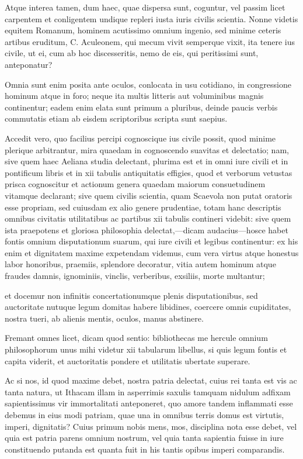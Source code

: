 Atque interea tamen, dum haec, quae dispersa sunt, coguntur, vel passim licet carpentem et conligentem undique repleri iusta iuris civilis scientia. Nonne videtis equitem Romanum, hominem acutissimo omnium ingenio, sed minime ceteris artibus eruditum, C. Aculeonem, qui mecum vivit semperque vixit, ita tenere ius civile, ut ei, cum ab hoc discesseritis, nemo de eis, qui peritissimi sunt, anteponatur?

 Omnia sunt enim posita ante oculos, conlocata in usu cotidiano, in congressione hominum atque in foro; neque ita multis litteris aut voluminibus magnis continentur; eadem enim elata sunt primum a pluribus, deinde paucis verbis commutatis etiam ab eisdem scriptoribus scripta sunt saepius.

 Accedit vero, quo facilius percipi cognoscique ius civile possit, quod minime plerique arbitrantur, mira quaedam in cognoscendo suavitas et delectatio; nam, sive quem haec Aeliana studia delectant, plurima est et in omni iure civili et in pontificum libris et in xii tabulis antiquitatis effigies, quod et verborum vetustas prisca cognoscitur et actionum genera quaedam maiorum consuetudinem vitamque declarant; sive quem civilis scientia, quam Scaevola non putat oratoris esse propriam, sed cuiusdam ex alio genere prudentiae, totam hanc descriptis omnibus civitatis utilitatibus ac partibus xii tabulis contineri videbit: sive quem ista praepotens et gloriosa philosophia delectat,—dicam audacius—hosce habet fontis omnium disputationum suarum, qui iure civili et legibus continentur: ex his enim et dignitatem maxime expetendam videmus, cum vera virtus atque honestus labor honoribus, praemiis, splendore decoratur, vitia autem hominum atque fraudes damnis, ignominiis, vinclis, verberibus, exsiliis, morte multantur;

 et docemur non infinitis concertationumque plenis disputationibus, sed auctoritate nutuque legum domitas habere libidines, coercere omnis cupiditates, nostra tueri, ab alienis mentis, oculos, manus abstinere.

 Fremant omnes licet, dicam quod sentio: bibliothecas me hercule omnium philosophorum unus mihi videtur xii tabularum libellus, si quis legum fontis et capita viderit, et auctoritatis pondere et utilitatis ubertate superare.

 Ac si nos, id quod maxime debet, nostra patria delectat, cuius rei tanta est vis ac tanta natura, ut Ithacam illam in asperrimis saxulis tamquam nidulum adfixam sapientissimus vir immortalitati anteponeret, quo amore tandem inflammati esse debemus in eius modi patriam, quae una in omnibus terris domus est virtutis, imperi, dignitatis? Cuius primum nobis mens, mos, disciplina nota esse debet, vel quia est patria parens omnium nostrum, vel quia tanta sapientia fuisse in iure constituendo putanda est quanta fuit in his tantis opibus imperi comparandis.

